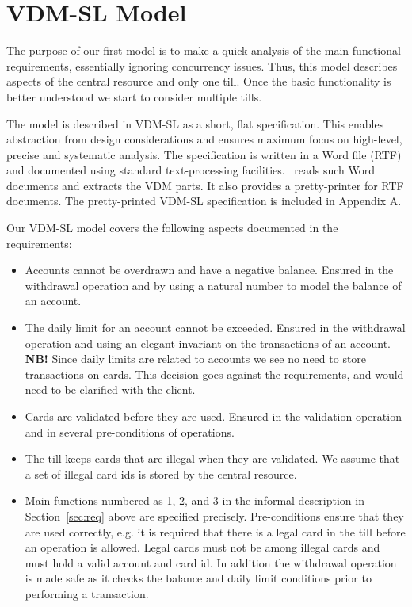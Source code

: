 \documentclass[\pformat,12pt,twoside]{article}
\begin{document}
\section{VDM-SL Model}\label{sec:VDMSL}

The purpose of our first model is to make a quick analysis of 
the main functional requirements, essentially ignoring concurrency 
issues. Thus, this model describes aspects of the central resource 
and only one till. Once the basic functionality is better understood 
we start to consider multiple tills.

The model is described in VDM-SL as a short, flat specification. 
This enables abstraction from design considerations and ensures 
maximum focus on high-level, precise and systematic analysis. 
The specification is written in a Word file (RTF) and documented 
using standard text-processing facilities. \vdmtools\  
reads such Word documents and extracts the VDM parts. It also 
provides a pretty-printer for RTF documents. The pretty-printed 
VDM-SL specification is included in Appendix A.


Our VDM-SL model covers the following aspects documented in the 
requirements:
\begin{itemize}
\item
Accounts cannot be overdrawn and have a negative balance. Ensured 
in the withdrawal operation and by using a natural number to 
model the balance of an account.
\item
The daily limit for an account cannot be exceeded. Ensured in 
the withdrawal operation and using an elegant invariant on the 
transactions of an account. \textbf{NB!} Since daily limits are related 
to accounts we see no need to store transactions on cards. This 
decision goes against the requirements, and would need to be 
clarified with the client.
\item
Cards are validated before they are used. Ensured in the validation 
operation and in several pre-conditions of operations.
\item
The till keeps cards that are illegal when they are validated. 
We assume that a set of illegal card ids is stored by the central 
resource.
\item
Main functions numbered as 1, 2, and 3 in the informal description in
Section~\ref{sec:req} above
are specified precisely. Pre-conditions ensure that they are 
used correctly, e.g. it is required that there is a legal card 
in the till before an operation is allowed. Legal cards must 
not be among illegal cards and must hold a valid account and 
card id. In addition the withdrawal operation is made safe as 
it checks the balance and daily limit conditions prior to performing 
a transaction.
\end{itemize}
\end{document}
